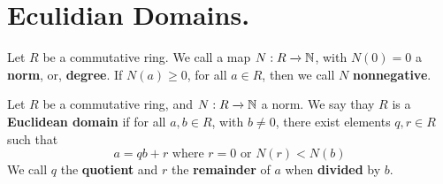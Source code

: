 \section{Eculidian Domains.}

\begin{definition}
    Let $R$ be a commutative ring. We call a map  $N:R \xrightarrow{} \mathbb{N}$, with
    $N(0)=0$ a \textbf{norm}, or, \textbf{degree}. If $N(a) \geq 0$, for all $a
    \in R$, then we call  $N$  \textbf{nonnegative}.
\end{definition}

\begin{definition}
    Let $R$ be a commutative ring, and  $N:R \xrightarrow{} \mathbb{N}$ a norm. We say
    thay $R$ is a \textbf{Euclidean domain} if for all $a,b \in R$, with $b \neq
    0$, there exist elements  $q,r \in R$ such that
    \begin{equation*}
        a=qb+r \text{ where } r=0 \text{ or } N(r)<N(b)
    \end{equation*}
    We call $q$ the  \textbf{quotient} and $r$ the  \textbf{remainder} of $a$
    when  \textbf{divided} by $b$.
\end{definition}

